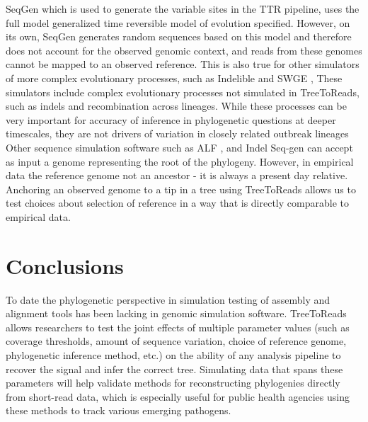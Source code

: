SeqGen \citep{rambaut_seq-gen:_1997} which is used to generate the variable sites in the TTR pipeline, uses the full model generalized time reversible model of evolution specified.
However, on its own, SeqGen generates random sequences based on this model and therefore does not account for the observed genomic context,
and reads from these genomes cannot be mapped to an observed reference.
This is also true for other simulators of more complex evolutionary processes, such as Indelible \citep{fletcher_indelible:_2009} and SWGE \citep{arenas_simulation_2014},
These simulators include complex evolutionary processes not simulated in TreeToReads, such as indels and recombination across lineages.
While these processes can be very important for accuracy of inference in phylogenetic questions at deeper timescales, they are not drivers of variation in closely related outbreak lineages
Other sequence simulation software such as ALF \citep{dalquen_alfsimulation_2012}, and Indel Seq-gen \citep{strope_indel-seq-gen:_2007}
can accept as input a genome representing the root of the phylogeny.
However, in empirical data the reference genome not an ancestor - it is always a present day relative.
Anchoring an observed genome to a tip in a tree using TreeToReads allows us to test choices about selection 
of reference in a way that is directly comparable to empirical data.


\section*{Conclusions}
To date the phylogenetic perspective in simulation testing of assembly and alignment tools has been lacking in genomic simulation software. 
TreeToReads allows researchers to test the joint effects of multiple parameter values (such as coverage thresholds, 
amount of sequence variation, choice of reference genome, phylogenetic inference method, etc.) on the ability of any analysis pipeline to recover the signal and infer the correct tree. 
Simulating data that spans these parameters will help validate methods for reconstructing phylogenies directly from short-read data, 
which is especially useful for public health agencies using these methods to track various emerging pathogens. 




